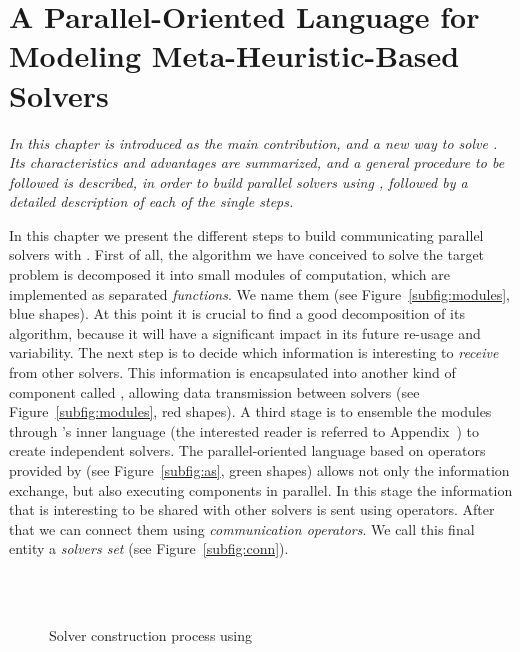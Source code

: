 \chapter{A Parallel-Oriented Language for Modeling Meta-Heuristic-Based Solvers}
\label{chap:posl}
\textit{In this chapter \posl{} is introduced as the main contribution, and a new way to solve \csps{}. Its characteristics and advantages are summarized, and a general procedure to be followed is described, in order to build parallel solvers using \posl, followed by a detailed description of each of the single steps.}
\vfill
\minitoc
\newpage

In this chapter we present the different steps to build communicating parallel solvers with \posl. 
First of all, the algorithm we have conceived to solve the target problem is decomposed it into small modules of computation, which are implemented as separated {\it functions}. We name them \oms{} (see Figure~\ref{subfig:modules}, blue shapes). At this point it is crucial to find a good decomposition of its algorithm, because it will have a significant impact in its future re-usage  and variability. The next step is to decide which information is interesting to \textit{receive} from other solvers. This information is encapsulated into another kind of component called \opch, allowing data transmission between solvers (see Figure~\ref{subfig:modules}, red shapes).
A third stage is to ensemble the modules through \posl{}'s inner language (the interested reader is referred to  Appendix~\tet{[...]}) to create independent solvers.
The parallel-oriented language based on operators provided by \posl{} (see Figure~\ref{subfig:as}, green shapes) allows not only the information exchange, but also executing components in parallel. In this stage the information that is interesting to be shared with other solvers is sent using operators. After that we can connect them using {\it communication operators}. We call this final entity a {\it solvers set} (see Figure~\ref{subfig:conn}).

\begin{figure}[h]
	\centering
	\\
	\\
	\caption[]{Solver construction process using \posl}
	\label{fig:posl}
\end{figure}

